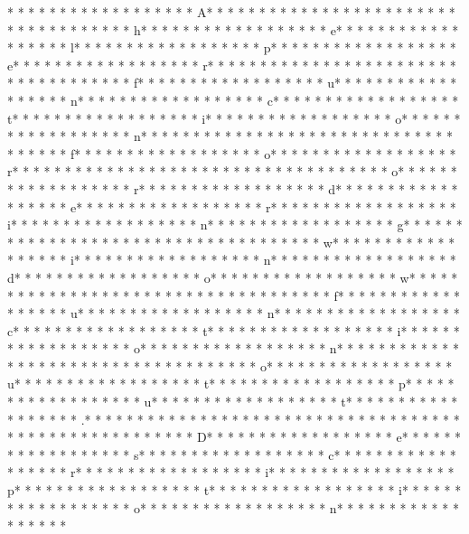 * * *  * * *  * * *  *  * * *  *  * * *  * A* * *  * * *  * * *  *  * * *  *  * * *  *  * * *  * * *  * * *  *  * * *  *  * * *  * h* * *  * * *  * * *  *  * * *  *  * * *  * e* * *  * * *  * * *  *  * * *  *  * * *  * l* * *  * * *  * * *  *  * * *  *  * * *  * p* * *  * * *  * * *  *  * * *  *  * * *  * e* * *  * * *  * * *  *  * * *  *  * * *  * r* * *  * * *  * * *  *  * * *  *  * * *  *  * * *  * * *  * * *  *  * * *  *  * * *  * f* * *  * * *  * * *  *  * * *  *  * * *  * u* * *  * * *  * * *  *  * * *  *  * * *  * n* * *  * * *  * * *  *  * * *  *  * * *  * c* * *  * * *  * * *  *  * * *  *  * * *  * t* * *  * * *  * * *  *  * * *  *  * * *  * i* * *  * * *  * * *  *  * * *  *  * * *  * o* * *  * * *  * * *  *  * * *  *  * * *  * n* * *  * * *  * * *  *  * * *  *  * * *  *  * * *  * * *  * * *  *  * * *  *  * * *  * f* * *  * * *  * * *  *  * * *  *  * * *  * o* * *  * * *  * * *  *  * * *  *  * * *  * r* * *  * * *  * * *  *  * * *  *  * * *  *  * * *  * * *  * * *  *  * * *  *  * * *  * o* * *  * * *  * * *  *  * * *  *  * * *  * r* * *  * * *  * * *  *  * * *  *  * * *  * d* * *  * * *  * * *  *  * * *  *  * * *  * e* * *  * * *  * * *  *  * * *  *  * * *  * r* * *  * * *  * * *  *  * * *  *  * * *  * i* * *  * * *  * * *  *  * * *  *  * * *  * n* * *  * * *  * * *  *  * * *  *  * * *  * g* * *  * * *  * * *  *  * * *  *  * * *  *  * * *  * * *  * * *  *  * * *  *  * * *  * w* * *  * * *  * * *  *  * * *  *  * * *  * i* * *  * * *  * * *  *  * * *  *  * * *  * n* * *  * * *  * * *  *  * * *  *  * * *  * d* * *  * * *  * * *  *  * * *  *  * * *  * o* * *  * * *  * * *  *  * * *  *  * * *  * w* * *  * * *  * * *  *  * * *  *  * * *  *  * * *  * * *  * * *  *  * * *  *  * * *  * f* * *  * * *  * * *  *  * * *  *  * * *  * u* * *  * * *  * * *  *  * * *  *  * * *  * n* * *  * * *  * * *  *  * * *  *  * * *  * c* * *  * * *  * * *  *  * * *  *  * * *  * t* * *  * * *  * * *  *  * * *  *  * * *  * i* * *  * * *  * * *  *  * * *  *  * * *  * o* * *  * * *  * * *  *  * * *  *  * * *  * n* * *  * * *  * * *  *  * * *  *  * * *  *  * * *  * * *  * * *  *  * * *  *  * * *  * o* * *  * * *  * * *  *  * * *  *  * * *  * u* * *  * * *  * * *  *  * * *  *  * * *  * t* * *  * * *  * * *  *  * * *  *  * * *  * p* * *  * * *  * * *  *  * * *  *  * * *  * u* * *  * * *  * * *  *  * * *  *  * * *  * t* * *  * * *  * * *  *  * * *  *  * * *  * .* * *  * * *  * * *  *  * * *  *  * * *  * 
* * *  * * *  * * *  *  * * *  *  * * *  * 
* * *  * * *  * * *  *  * * *  *  * * *  * D* * *  * * *  * * *  *  * * *  *  * * *  * e* * *  * * *  * * *  *  * * *  *  * * *  * s* * *  * * *  * * *  *  * * *  *  * * *  * c* * *  * * *  * * *  *  * * *  *  * * *  * r* * *  * * *  * * *  *  * * *  *  * * *  * i* * *  * * *  * * *  *  * * *  *  * * *  * p* * *  * * *  * * *  *  * * *  *  * * *  * t* * *  * * *  * * *  *  * * *  *  * * *  * i* * *  * * *  * * *  *  * * *  *  * * *  * o* * *  * * *  * * *  *  * * *  *  * * *  * n* * *  * * *  * * *  *  * * *  *  * * *  * 
